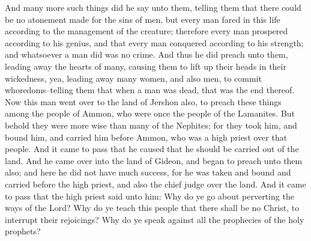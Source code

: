 And many more such things did he say unto them, telling them that there could be no atonement made for the sins of men, but every man fared in this life according to the management of the creature; therefore every man prospered according to his genius, and that every man conquered according to his strength; and whatsoever a man did was no crime.
\bverse \iffalse And thus he did preach unto them, leading away the hearts of many, causing them to lift up their heads in their wickedness, yea, leading away many women, and also men, to commit whoredoms--telling them that when a man was dead, that was the end thereof. \fi
And thus he did preach unto them, leading away the hearts of many, causing them to lift up their heads in their wickedness, yea, leading away many women, and also men, to commit whoredoms--telling them that when a man was dead, that was the end thereof.
\bverse \iffalse Now this man went over to the land of Jershon also, to preach these things among the people of Ammon, who were once the people of the Lamanites. \fi
Now this man went over to the land of Jershon also, to preach these things among the people of Ammon, who were once the people of the Lamanites.
\bverse \iffalse But behold they were more wise than many of the Nephites; for they took him, and bound him, and carried him before Ammon, who was a high priest over that people. \fi
But behold they were more wise than many of the Nephites; for they took him, and bound him, and carried him before Ammon, who was a high priest over that people.
\bverse \iffalse And it came to pass that he caused that he should be carried out of the land. And he came over into the land of Gideon, and began to preach unto them also; and here he did not have much success, for he was taken and bound and carried before the high priest, and also the chief judge over the land. \fi
And it came to pass that he caused that he should be carried out of the land. And he came over into the land of Gideon, and began to preach unto them also; and here he did not have much success, for he was taken and bound and carried before the high priest, and also the chief judge over the land.
\bverse \iffalse And it came to pass that the high priest said unto him: Why do ye go about perverting the ways of the Lord? Why do ye teach this people that there shall be no Christ, to interrupt their rejoicings? Why do ye speak against all the prophecies of the holy prophets? \fi
And it came to pass that the high priest said unto him: Why do ye go about perverting the ways of the Lord? Why do ye teach this people that there shall be no Christ, to interrupt their rejoicings? Why do ye speak against all the prophecies of the holy prophets?
